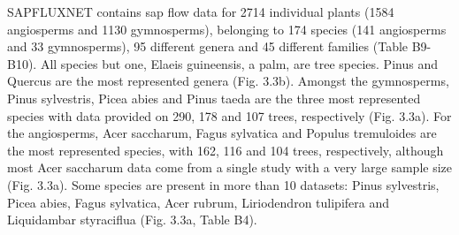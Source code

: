 \documentclass[11pt,twoside]{reedthesis}
\begin{document}
SAPFLUXNET contains sap flow data for 2714 individual plants (1584
angiosperms and 1130 gymnosperms), belonging to 174 species (141
angiosperms and 33 gymnosperms), 95 different genera and 45 different
families (Table B9-B10). All species but one, Elaeis guineensis, a palm,
are tree species. Pinus and Quercus are the most represented genera
(Fig. 3.3b). Amongst the gymnosperms, Pinus sylvestris, Picea abies and
Pinus taeda are the three most represented species with data provided on
290, 178 and 107 trees, respectively (Fig. 3.3a). For the angiosperms,
Acer saccharum, Fagus sylvatica and Populus tremuloides are the most
represented species, with 162, 116 and 104 trees, respectively, although
most Acer saccharum data come from a single study with a very large
sample size (Fig. 3.3a). Some species are present in more than 10
datasets: Pinus sylvestris, Picea abies, Fagus sylvatica, Acer rubrum,
Liriodendron tulipifera and Liquidambar styraciflua (Fig. 3.3a, Table
B4).\par
\end{document}
